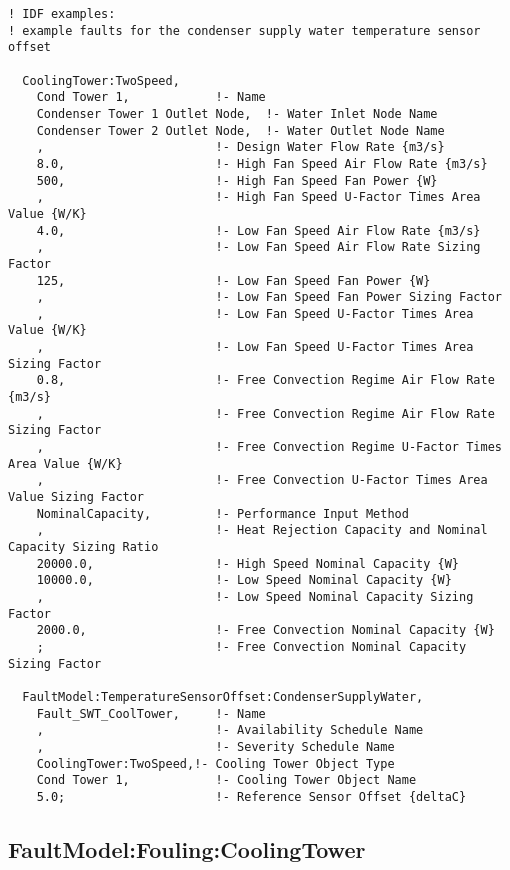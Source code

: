 \begin{lstlisting}
! IDF examples:
! example faults for the condenser supply water temperature sensor offset

  CoolingTower:TwoSpeed,
    Cond Tower 1,            !- Name
    Condenser Tower 1 Outlet Node,  !- Water Inlet Node Name
    Condenser Tower 2 Outlet Node,  !- Water Outlet Node Name
    ,                        !- Design Water Flow Rate {m3/s}
    8.0,                     !- High Fan Speed Air Flow Rate {m3/s}
    500,                     !- High Fan Speed Fan Power {W}
    ,                        !- High Fan Speed U-Factor Times Area Value {W/K}
    4.0,                     !- Low Fan Speed Air Flow Rate {m3/s}
    ,                        !- Low Fan Speed Air Flow Rate Sizing Factor
    125,                     !- Low Fan Speed Fan Power {W}
    ,                        !- Low Fan Speed Fan Power Sizing Factor
    ,                        !- Low Fan Speed U-Factor Times Area Value {W/K}
    ,                        !- Low Fan Speed U-Factor Times Area Sizing Factor
    0.8,                     !- Free Convection Regime Air Flow Rate {m3/s}
    ,                        !- Free Convection Regime Air Flow Rate Sizing Factor
    ,                        !- Free Convection Regime U-Factor Times Area Value {W/K}
    ,                        !- Free Convection U-Factor Times Area Value Sizing Factor
    NominalCapacity,         !- Performance Input Method
    ,                        !- Heat Rejection Capacity and Nominal Capacity Sizing Ratio
    20000.0,                 !- High Speed Nominal Capacity {W}
    10000.0,                 !- Low Speed Nominal Capacity {W}
    ,                        !- Low Speed Nominal Capacity Sizing Factor
    2000.0,                  !- Free Convection Nominal Capacity {W}
    ;                        !- Free Convection Nominal Capacity Sizing Factor
  
  FaultModel:TemperatureSensorOffset:CondenserSupplyWater,
    Fault_SWT_CoolTower,     !- Name
    ,                        !- Availability Schedule Name
    ,                        !- Severity Schedule Name
    CoolingTower:TwoSpeed,!- Cooling Tower Object Type
    Cond Tower 1,            !- Cooling Tower Object Name
    5.0;                     !- Reference Sensor Offset {deltaC}

\end{lstlisting}


\subsection{FaultModel:Fouling:CoolingTower}\label{faultmodelfoulingcoolingtower}

